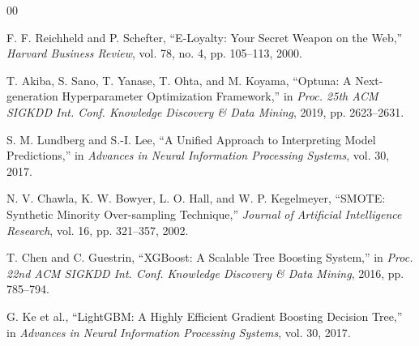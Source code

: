 \documentclass[conference]{IEEEtran}
\begin{document}
\begin{thebibliography}{00}

F. F. Reichheld and P. Schefter, ``E-Loyalty: Your Secret Weapon on the Web,'' \textit{Harvard Business Review}, vol. 78, no. 4, pp. 105--113, 2000.

T. Akiba, S. Sano, T. Yanase, T. Ohta, and M. Koyama, ``Optuna: A Next-generation Hyperparameter Optimization Framework,'' in \textit{Proc. 25th ACM SIGKDD Int. Conf. Knowledge Discovery \& Data Mining}, 2019, pp. 2623--2631.

S. M. Lundberg and S.-I. Lee, ``A Unified Approach to Interpreting Model Predictions,'' in \textit{Advances in Neural Information Processing Systems}, vol. 30, 2017.

N. V. Chawla, K. W. Bowyer, L. O. Hall, and W. P. Kegelmeyer, ``SMOTE: Synthetic Minority Over-sampling Technique,'' \textit{Journal of Artificial Intelligence Research}, vol. 16, pp. 321--357, 2002.

T. Chen and C. Guestrin, ``XGBoost: A Scalable Tree Boosting System,'' in \textit{Proc. 22nd ACM SIGKDD Int. Conf. Knowledge Discovery \& Data Mining}, 2016, pp. 785--794.

G. Ke et al., ``LightGBM: A Highly Efficient Gradient Boosting Decision Tree,'' in \textit{Advances in Neural Information Processing Systems}, vol. 30, 2017.

\end{thebibliography}
\end{document}
